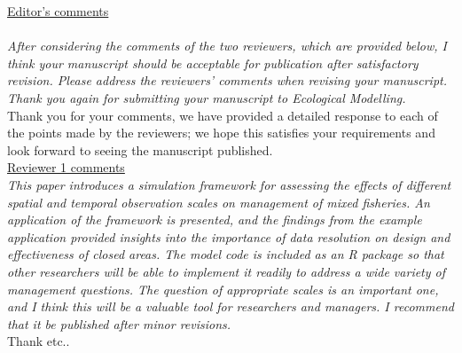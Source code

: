 \documentclass{article}
\begin{document}
\begin{landscape}

\underline{Editor's comments} \\
\\
\textit{
After considering the comments of the two reviewers, which are provided below,
I think your manuscript should be acceptable for publication after satisfactory
revision.  Please address the reviewers' comments when revising your
manuscript.  Thank you again for submitting your manuscript to Ecological
Modelling.
} \\

Thank you for your comments, we have provided a detailed response to each of
the points made by the reviewers; we hope this satisfies your requirements and
look forward to seeing the manuscript published. \\


\underline{Reviewer 1 comments} \\

\textit{This paper introduces a simulation framework for assessing the effects
	of different spatial and temporal observation scales on management of
	mixed fisheries. An application of the framework is presented, and the
	findings from the example application provided insights into the
	importance of data resolution on design and effectiveness of closed
	areas. The model code is included as an R package so that other
	researchers will be able to implement it readily to address a wide
	variety of management questions. The question of appropriate scales is
	an important one, and I think this will be a valuable tool for
	researchers and managers. I recommend that it be published after minor
	revisions.} \\

Thank etc..


\end{landscape}
\end{document}
